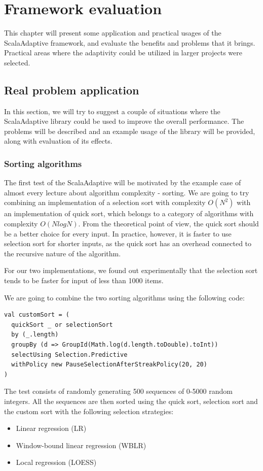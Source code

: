 \chapter{Framework evaluation}

This chapter will present some application and practical usages of the ScalaAdaptive framework, and evaluate the benefits and problems that it brings. Practical areas where the adaptivity could be utilized in larger projects were selected.

\section{Real problem application}

In this section, we will try to suggest a couple of situations where the ScalaAdaptive library could be used to improve the overall performance. The problems will be described and an example usage of the library will be provided, along with evaluation of its effects.

\subsection{Sorting algorithms}

The first test of the ScalaAdaptive will be motivated by the example case of almost every lecture about algorithm complexity - sorting. We are going to try combining an implementation of a selection sort with complexity $O(N^2)$ with an implementation of quick sort, which belongs to a category of algorithms with complexity $O(N logN)$. From the theoretical point of view, the quick sort should be a better choice for every input. In practice, however, it is faster to use selection sort for shorter inputs, as the quick sort has an overhead connected to the recursive nature of the algorithm.

For our two implementations, we found out experimentally that the selection sort tends to be faster for input of less than 1000 items.

We are going to combine the two sorting algorithms using the following code:
\lstset{style=Scala}
\begin{lstlisting}
val customSort = (
  quickSort _ or selectionSort
  by (_.length) 
  groupBy (d => GroupId(Math.log(d.length.toDouble).toInt))
  selectUsing Selection.Predictive 
  withPolicy new PauseSelectionAfterStreakPolicy(20, 20)
)
\end{lstlisting}

The test consists of randomly generating 500 sequences of 0-5000 random integers. All the sequences are then sorted using the quick sort, selection sort and the custom sort with the following selection strategies:
\begin{itemize}
	\item Linear regression (LR)
	\item Window-bound linear regression (WBLR)
	\item Local regression (LOESS)
\end{itemize}


